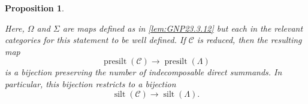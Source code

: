 \documentclass[10pt,twoside, a4paper,reqno]{amsart}
\DeclareMathOperator{\silt}{silt}
\DeclareMathOperator{\presilt}{presilt}
\newcommand{\calC}{\mathcal{C}}
\newtheorem{proposition}[theorem]{Proposition}
\theoremstyle{definition}
\begin{document}
\begin{proposition}
\begin{enumerate}
\begin{equation}
    \end{equation}
    Here, $\Omega$ and $\Sigma$ are maps defined as in \cref{lem:GNP23.3.12} but each in the relevant categories for this statement to be well defined.
    If $\calC$ is reduced, then the resulting map
     \begin{equation}\label{eq:presilt_C_Lambda}
        \presilt(\calC) \to \presilt(\Lambda)
    \end{equation}
    is a bijection preserving the number of {indecomposable} direct summands. In particular, this bijection restricts to a bijection 
    \begin{equation}\label{eq:silt_C_Lambda}
        \silt(\calC) \to \silt(\Lambda).
    \end{equation} 
    \end{enumerate}
    \end{proposition}
\end{document}
